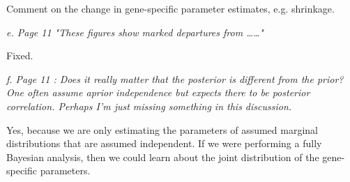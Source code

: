 \documentclass{article}
\newcommand{\comment}[1]{\textit{#1}}
\newcommand{\response}[1]{#1}
\newcommand{\todo}[1]{{\color{red} #1}}
\begin{document}
\todo{Comment on the change in gene-specific parameter estimates, e.g. shrinkage.}

\comment{e.      Page 11 "These figures show marked departures from ……"}

\response{Fixed.}

\comment{f.      Page 11 : Does it really matter that the posterior is different from the prior?  One often assume aprior independence but expects there to be posterior correlation.  Perhaps I'm just missing something in this discussion.}

\todo{Yes, because we are only estimating the parameters of assumed marginal distributions that are assumed independent. If we were performing a fully Bayesian analysis, then we could learn about the joint distribution of the gene-specific parameters.}
\end{document}
